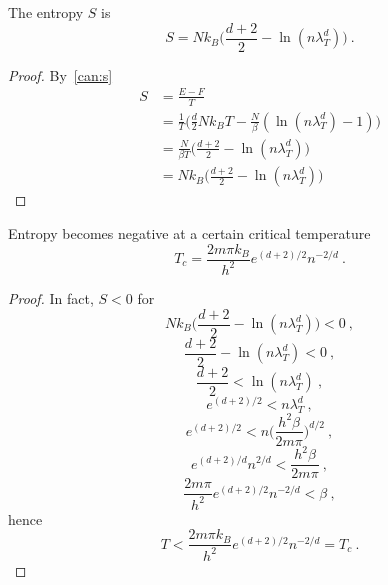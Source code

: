     The entropy $S$ is 
    \begin{equation*}
        S = N k_B \Big ( \frac{d+2}{2} - \ln (n \lambda_T^d) \Big ) ~.
    \end{equation*}
    \begin{proof}
        By~\eqref{can:s}
        \begin{equation*}
        \begin{aligned}
            S & = \frac{E - F}{T} \\ & = \frac{1}{T} \Big ( \frac{d}{2} N k_B T - \frac{N}{\beta} (\ln (n \lambda_T^d) - 1) \Big ) \\ & = \frac{N}{\beta T} \Big ( \frac{d+2}{2} - \ln (n \lambda_T^d) \Big ) \\ & = N k_B \Big ( \frac{d+2}{2} - \ln (n \lambda_T^d) \Big )
        \end{aligned}
        \end{equation*}
    \end{proof}

    Entropy becomes negative at a certain critical temperature
    \begin{equation*}
        T_c = \frac{2 m \pi k_B}{h^2} e^{(d+2)/2} n^{-2/d} ~.
    \end{equation*}
    \begin{proof}
        In fact, $S < 0$ for 
        \begin{equation*}
            N k_B \Big ( \frac{d+2}{2} - \ln (n \lambda_T^d) \Big ) < 0 ~,
        \end{equation*}
        \begin{equation*}
            \frac{d+2}{2} - \ln (n \lambda_T^d) < 0 ~,
        \end{equation*}
        \begin{equation*}
            \frac{d+2}{2} < \ln (n \lambda_T^d) ~,
        \end{equation*}
        \begin{equation*}
            e^{(d+2)/2} < n \lambda_T^d  ~,
        \end{equation*}
        \begin{equation*}
            e^{(d+2)/2} < n \Big ( \frac{h^2 \beta}{2 m \pi} \Big )^{d/2}  ~,
        \end{equation*}
        \begin{equation*}
            e^{(d+2)/d} n^{2/d} < \frac{h^2 \beta}{2 m \pi} ~,
        \end{equation*}
        \begin{equation*}
            \frac{2 m \pi}{h^2} e^{(d+2)/2} n^{-2/d} < \beta ~,
        \end{equation*}
        hence 
        \begin{equation*}
            T < \frac{2 m \pi k_B}{h^2} e^{(d+2)/2} n^{-2/d} = T_c ~.
        \end{equation*}
    \end{proof}
    
